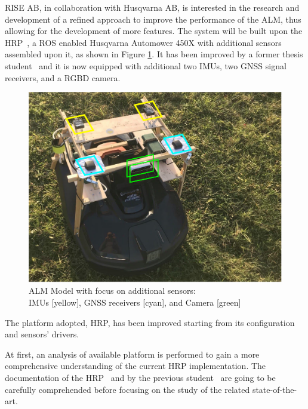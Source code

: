 \noindent
RISE AB, in collaboration with Husqvarna AB, is interested in the research and development of a refined approach to improve the performance of the \gls{ALM}, thus allowing for the development of more features.
The system will be built upon the \Gls{HRP}~\cite{HRP}, a \Gls{ROS} enabled Husqvarna Automower 450X with additional sensors assembled upon it, as shown in Figure \ref{fig:HardwareSetup}.
It has been improved by a former thesis student~\cite{HRPTianze} and it is now equipped with additional two \Glspl{IMU}, two \Gls{GNSS} signal receivers, and a \Gls{RGBD} camera.

\begin{figure}[!ht]
	\begin{center}
		\includegraphics[width=1.0\textwidth]{Images/1-Introduction/projectTheme.pdf}
		\caption{
			\gls{ALM} Model with focus on additional sensors:\\
			\glspl{IMU} [yellow], \gls{GNSS} receivers [cyan], and Camera [green]
			\centering }
		\label{fig:HardwareSetup}
	\end{center}
\end{figure}


The platform adopted, \gls{HRP}, has been improved starting from its configuration and sensors' drivers.


At first, an analysis of available platform is performed to gain a more comprehensive understanding of the current \gls{HRP} implementation.
The documentation of the \gls{HRP}~\cite{HRP} and by the previous student~\cite{HRPTianze} are going to be carefully comprehended before focusing on the study of the related state-of-the-art.


